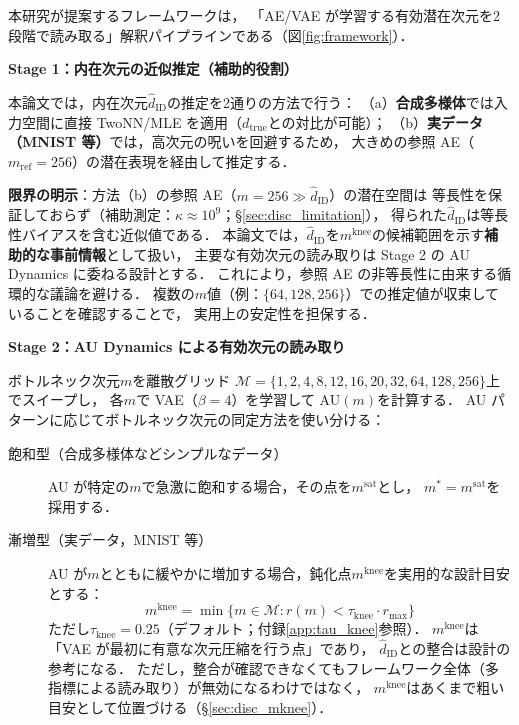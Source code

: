 \documentclass[11pt,a4paper]{jsarticle}
\newcommand{\dzopt}{m^*}
\newcommand{\dtrue}{d_{\mathrm{true}}}
\newcommand{\kap}{\kappa}
\newcommand{\dzsat}{m^{\mathrm{sat}}}
\newcommand{\mknee}{m^{\mathrm{knee}}}
\begin{document}
本研究が提案するフレームワークは，
「AE/VAE が学習する有効潜在次元を2段階で読み取る」解釈パイプラインである（図\ref{fig:framework}）．

\textbf{Stage 1：内在次元の近似推定（補助的役割）}

本論文では，内在次元$\hat{d}_\mathrm{ID}$の推定を2通りの方法で行う：
（a）\textbf{合成多様体}では入力空間に直接 TwoNN/MLE を適用（$\dtrue$との対比が可能）；
（b）\textbf{実データ（MNIST 等）}では，高次元の呪いを回避するため，
大きめの参照 AE（$m_{\mathrm{ref}} = 256$）の潜在表現を経由して推定する．

\textbf{限界の明示}：方法（b）の参照 AE（$m = 256 \gg \hat{d}_\mathrm{ID}$）の潜在空間は
等長性を保証しておらず（補助測定：$\kap \approx 10^9$；§\ref{sec:disc_limitation}），
得られた$\hat{d}_\mathrm{ID}$は等長性バイアスを含む近似値である．
本論文では，$\hat{d}_\mathrm{ID}$を$\mknee$の候補範囲を示す\textbf{補助的な事前情報}として扱い，
主要な有効次元の読み取りは Stage 2 の AU Dynamics に委ねる設計とする．
これにより，参照 AE の非等長性に由来する循環的な議論を避ける．
複数の$m$値（例：$\{64, 128, 256\}$）での推定値が収束していることを確認することで，
実用上の安定性を担保する．

\textbf{Stage 2：AU Dynamics による有効次元の読み取り}

ボトルネック次元$m$を離散グリッド
$\mathcal{M} = \{1, 2, 4, 8, 12, 16, 20, 32, 64, 128, 256\}$上でスイープし，
各$m$で VAE（$\beta = 4$）を学習して AU$(m)$を計算する．
AU パターンに応じてボトルネック次元の同定方法を使い分ける：

\begin{description}
  \item[飽和型（合成多様体などシンプルなデータ）]
        AU が特定の$m$で急激に飽和する場合，その点を$\dzsat$とし，
        $\dzopt = \dzsat$を採用する．
  \item[漸増型（実データ，MNIST 等）]
        AU が$m$とともに緩やかに増加する場合，鈍化点$\mknee$を実用的な設計目安とする：
        \begin{equation}
          \mknee = \min\{m \in \mathcal{M} : r(m) < \tau_{\mathrm{knee}} \cdot r_{\max}\}
          \label{eq:mknee}
        \end{equation}
        ただし$\tau_{\mathrm{knee}} = 0.25$（デフォルト；付録\ref{app:tau_knee}参照）．
        $\mknee$は「VAE が最初に有意な次元圧縮を行う点」であり，
        $\hat{d}_\mathrm{ID}$との整合は設計の参考になる．
        ただし，整合が確認できなくてもフレームワーク全体（多指標による読み取り）が無効になるわけではなく，
        $\mknee$はあくまで粗い目安として位置づける（§\ref{sec:disc_mknee}）．
\end{description}
\end{document}
